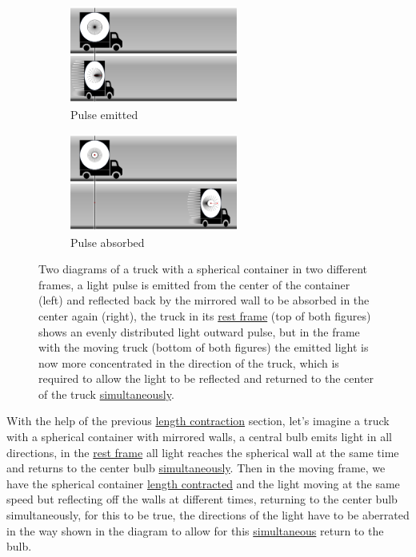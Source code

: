 \begin{figure}[htbp]
	\centering
	\begin{subfigure}{.49\textwidth}
		\centering
		\includegraphics[width=5.5cm]{images/pdf/Aberrated_lorrys_1.pdf}
		\caption{Pulse emitted}
		\label{fig: truck aberrated 1}
	\end{subfigure}
	\begin{subfigure}{.49\textwidth}
		\centering
		\includegraphics[width=5.5cm]{images/pdf/Aberrated_lorrys_2.pdf}
		\caption{Pulse absorbed}
		\label{fig: truck aberrated 2}
	\end{subfigure}
	\caption{Two diagrams of a truck with a spherical container in two different frames, a light pulse is emitted from the center of the container (left) and reflected back by the mirrored wall to be absorbed in the center again (right), the truck in its \protect\hyperlink{def-proper-frame}{rest frame} (top of both figures) shows an evenly distributed light outward pulse, but in the frame with the moving truck (bottom of both figures) the emitted light is now more concentrated in the direction of the truck, which is required to allow the light to be reflected and returned to the center of the truck \protect\hyperlink{def-simultaneity}{simultaneously}.}
	\label{fig: truck aberrated}
\end{figure}

With the help of the previous \hyperlink{def-length-contraction}{length contraction} section, let's imagine a truck with a spherical container with mirrored walls, a central bulb emits light in all directions, in the \hyperlink{def-proper-frame}{rest frame} all light reaches the spherical wall at the same time and returns to the center bulb \hyperlink{def-simultaneity}{simultaneously}.
Then in the moving frame, we have the spherical container \hyperlink{def-length-contraction}{length contracted} and the light moving at the same speed but reflecting off the walls at different times, returning to the center bulb simultaneously, for this to be true, the directions of the light have to be aberrated in the way shown in the diagram to allow for this \hyperlink{def-simultaneity}{simultaneous} return to the bulb.

